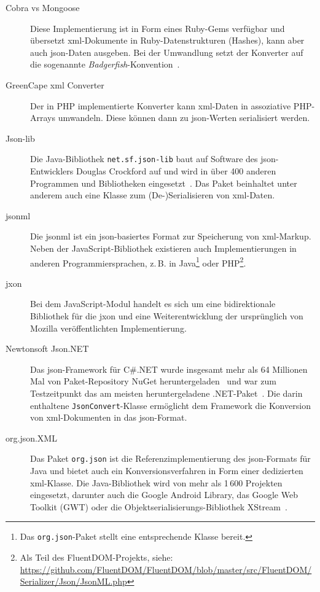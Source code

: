 \begin{description}
    \item[Cobra vs Mongoose] Diese Implementierung ist in Form eines Ruby-Gems verfügbar und übersetzt \acrshort{xml}-Dokumente in Ruby-Datenstrukturen (Hashes), kann aber auch \acrshort{json}-Daten ausgeben. Bei der Umwandlung setzt der  Konverter auf die sogenannte \emph{Badgerfish}-Konvention~\cite[Abschn.~3]{cobravsmongoose,open311-conventions}.
    \item[GreenCape \acrshort{xml} Converter] Der in PHP implementierte Konverter kann \acrshort{xml}-Daten in asso\-ziative PHP-Arrays umwandeln. Diese können dann zu \acrshort{json}-Werten serialisiert werden.
    \item[Json-lib] Die Java-Bibliothek \texttt{net.sf.json-lib} baut auf Software des \acrshort{json}\hyp{}Entwicklers Douglas Crockford auf und wird in über 400 anderen Programmen und Biblio\-theken eingesetzt~\cite{mvn-jsonlib}. Das Paket beinhaltet unter anderem auch eine Klasse zum (De-)Serialisieren von \acrshort{xml}-Daten.
    \item[{\acrshort{jsonml}}] Die \acrfull{jsonml} ist ein \acrshort{json}-basiertes Format zur Speicherung von \acrshort{xml}-Markup. Neben der JavaScript-Bibliothek existieren auch Implementierungen in anderen Programmiersprachen, z.\,B. in Java\footnote{Das \texttt{org.json}-Paket stellt eine entsprechende Klasse bereit.}  oder PHP\footnote{Als Teil des FluentDOM-Projekts, siehe: \url{https://github.com/FluentDOM/FluentDOM/blob/master/src/FluentDOM/Serializer/Json/JsonML.php}}.
    \item[{\acrshort{jxon}}] Bei dem JavaScript-Modul handelt es sich um eine bidirektionale Bibliothek für die \acrlong{jxon} und eine Weiterentwicklung der ursprünglich von Mozilla veröffentlichten Implementierung.
    \item[Newtonsoft Json.NET] Das \acrshort{json}-Framework für C\#.NET wurde insgesamt mehr als 64 Millionen Mal von Paket-Repository NuGet heruntergeladen~\cite{nugetjsonnet} und war zum Testzeitpunkt das am meisten heruntergeladene .NET-Paket~\cite{nugetstatistics}. Die darin enthaltene \texttt{JsonConvert}-Klasse ermöglicht dem Framework die Konversion von \acrshort{xml}-Dokumenten in das \acrshort{json}-Format.
    \item[org.json.XML] Das Paket \texttt{org.json} ist die Referenzimplementierung des \acrshort{json}\hyp{}Formats für Java und bietet auch ein Konversionsverfahren in Form einer dedizierten \acrshort{xml}-Klasse. Die Java-Bibliothek wird von mehr als 1\,600 Projekten eingesetzt, darunter auch die Google Android Library, das Google Web Toolkit (GWT) oder die Objektserialisierungs\hyp{}Bibliothek XStream~\cite{mvn-orgjsonxml}.

\end{description}
